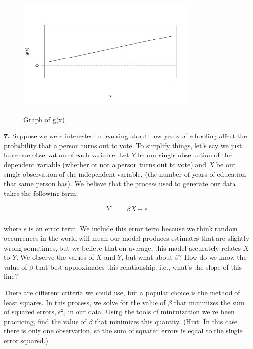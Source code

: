 \documentclass[12pt]{article}
\begin{document}
\begin{figure}[!ht]
\centering
\caption{Graph of g(x)}
\includegraphics[height=2.5in, width=3.5in]{function2.pdf}
\end{figure}

\noindent \textbf{7.}
Suppose we were interested in learning about how years of schooling affect the probability that a person turns out to vote. To simplify things, let's say we just have one observation of each variable. Let $Y$ be our single observation of the dependent variable (whether or not a person turns out to vote) and $X$ be our single observation of the independent variable, (the number of years of education that same person has). We believe that the process used to generate our data takes the following form:

\bigskip
\begin{eqnarray*}
Y&=&\beta X + \epsilon\\
 \end{eqnarray*}
 
 where $\epsilon$ is an error term. We include this error term because we think random occurrences in the world will mean our model produces estimates that are slightly wrong sometimes, but we believe that on average, this model accurately relates $X$ to $Y$. We observe the values of $X$ and $Y$, but what about $\beta$? How do we know the value of $\beta$ that best approximates this relationship, i.e., what's the slope of this line?
 
 There are different criteria we could use, but a popular choice is the method of least squares. In this process, we solve for the value of $\beta$ that minimizes the sum of squared errors, $\epsilon^2$, in our data. Using the tools of minimization we've been practicing, find the value of $\beta$ that minimizes this quantity. (Hint: In this case there is only one observation, so the sum of squared errors is equal to the single error squared.)
\end{document}
